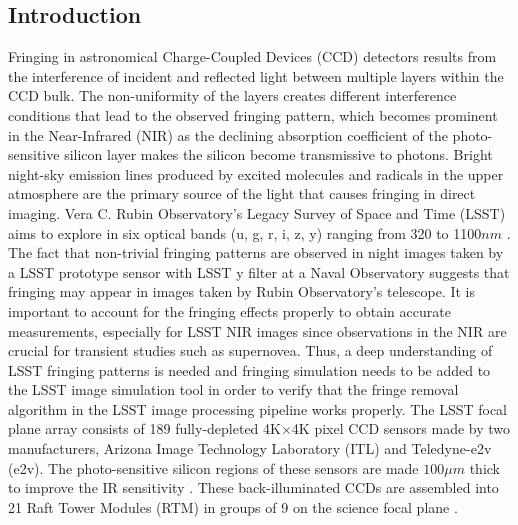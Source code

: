 \documentclass[twocolumn]{aastex63} %
\begin{document}
\begin{CJK*}{UTF8}{gbsn}
\section{Introduction}
Fringing in astronomical Charge-Coupled Devices (CCD) detectors results from the interference of incident and reflected light between multiple layers within the CCD bulk. The non-uniformity of the layers creates different interference conditions that lead to the observed fringing pattern, which becomes prominent in the Near-Infrared (NIR) as the declining absorption coefficient of the photo-sensitive silicon layer makes the silicon become transmissive to photons. Bright night-sky emission lines produced by excited molecules and radicals in the upper atmosphere are the primary source of the light that causes fringing in direct imaging. Vera C. Rubin Observatory's Legacy Survey of Space and Time (LSST) aims to explore in six optical bands (u, g, r, i, z, y) ranging from 320 to 1100$nm$ \citep{LSST09}. The fact that non-trivial fringing patterns are observed in night images taken by a LSST prototype sensor with LSST y filter at a Naval Observatory \citep{Brooks17} suggests that fringing may appear in images taken by Rubin Observatory's telescope. It is important to account for the fringing effects properly to obtain accurate measurements, especially for LSST NIR images since observations in the NIR are crucial for transient studies such as supernovea. Thus, a deep understanding of LSST fringing patterns is needed and fringing simulation needs to be added to the LSST image simulation tool \citep{LSST21} in order to verify that the fringe removal algorithm in the LSST image processing pipeline works properly. The LSST focal plane array consists of 189 fully-depleted 4K$\times$4K  pixel CCD sensors made by two manufacturers, Arizona Image Technology Laboratory (ITL) and Teledyne-e2v (e2v). The photo-sensitive silicon regions of these sensors are made $100\mu m$ thick to improve the IR sensitivity \citep{Connor19}. These back-illuminated CCDs are assembled into 21  Raft Tower Modules (RTM) in groups of 9 on the science focal plane \citep{Connor16}. 


\end{CJK*}
\end{document}

